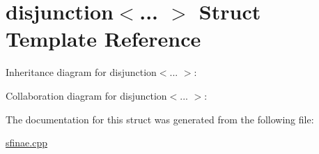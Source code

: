 \hypertarget{structdisjunction}{}\section{disjunction$<$... $>$ Struct Template Reference}
\label{structdisjunction}


Inheritance diagram for disjunction$<$... $>$\+:


Collaboration diagram for disjunction$<$... $>$\+:


The documentation for this struct was generated from the following file\+:\begin{DoxyCompactItemize}
\item 
\hyperlink{sfinae_8cpp}{sfinae.\+cpp}\end{DoxyCompactItemize}

